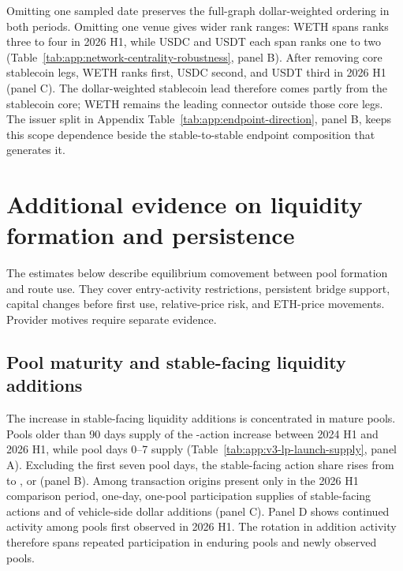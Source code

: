 Omitting one sampled date preserves the full-graph dollar-weighted ordering in both periods. Omitting one venue gives wider rank ranges: WETH spans ranks three to four in 2026 H1, while USDC and USDT each span ranks one to two (Table~\ref{tab:app:network-centrality-robustness}, panel B). After removing core stablecoin legs, WETH ranks first, USDC second, and USDT third in 2026 H1 (panel C). The dollar-weighted stablecoin lead therefore comes partly from the stablecoin core; WETH remains the leading connector outside those core legs. The issuer split in Appendix Table~\ref{tab:app:endpoint-direction}, panel B, keeps this scope dependence beside the stable-to-stable endpoint composition that generates it.

\section{Additional evidence on liquidity formation and persistence}
\label{app:secondary-mechanisms}

The estimates below describe equilibrium comovement between pool formation and route use. They cover entry-activity restrictions, persistent bridge support, capital changes before first use, relative-price risk, and ETH-price movements. Provider motives require separate evidence.

\subsection{Pool maturity and stable-facing liquidity additions}

The increase in stable-facing liquidity additions is concentrated in mature pools. Pools older than 90 days supply \VThreeLPMaturePoolIncreaseShare{} of the \VThreeLPLaunchStableActionIncrease{}-action increase between 2024 H1 and 2026 H1, while pool days 0--7 supply \VThreeLPLaunchWeekIncreaseShare{} (Table~\ref{tab:app:v3-lp-launch-supply}, panel A). Excluding the first seven pool days, the stable-facing action share rises from \VThreeLPExLaunchStableShareBaseline{} to \VThreeLPExLaunchStableShareComparison{}, or \VThreeLPExLaunchStableShareChange{} (panel B). Among transaction origins present only in the 2026 H1 comparison period, one-day, one-pool participation supplies \VThreeLPOneDayOnePoolActionShare{} of stable-facing actions and \VThreeLPOneDayOnePoolFlowShare{} of vehicle-side dollar additions (panel C). Panel D shows continued activity among pools first observed in 2026 H1. The rotation in addition activity therefore spans repeated participation in enduring pools and newly observed pools.

